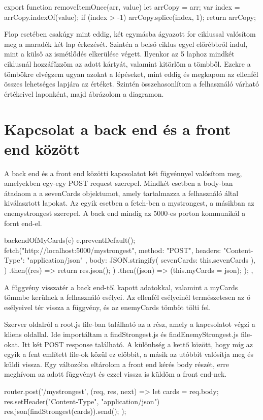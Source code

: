 \begin{python}
export function removeItemOnce(arr, value) {
    let arrCopy = arr;
    var index = arrCopy.indexOf(value);
    if (index > -1) {
      arrCopy.splice(index, 1);
    }
    return arrCopy;
}
\end{python}

Flop esetében csakúgy mint eddig, két egymásba ágyazott for ciklussal valósítom meg a maradék két lap érkezését. Szintén a belső ciklus egyel előrébbről indul, mint a külső az ismétlődés elkerülése végett. Ilyenkor az 5 laphoz mindkét ciklusnál hozzáfűzzöm az adott kártyát, valamint kitörlöm a tömbből. Ezekre a tömbökre elvégzem ugyan azokat a lépéseket, mint eddig és megkapom az ellenfél összes lehetséges lapjára az értéket. Szintén összehasonlítom a felhasználó várható értékeivel laponként, majd ábrázolom a diagramon.

\section{Kapcsolat a back end és a front end között}
A back end és a front end közötti kapcsolatot két fügvénnyel valósítom meg, amelyekben egy-egy POST request szerepel. Mindkét esetben a body-ban átadaom a a sevenCards objektumot, amely tartalmazza a felhasználó által kiválasztott lapokat. Az egyik esetben a fetch-ben a mystrongest, a másikban az enemystrongest szerepel. A back end mindig az 5000-es porton kommunikál a fornt end-el.

\begin{python}
backendOfMyCards(e) {
      e.preventDefault();
      fetch("http://localhost:5000/mystrongest", {
        method: "POST",
        headers: { "Content-Type": "application/json" },
        body: JSON.stringify({ sevenCards: this.sevenCards }),
      })
        .then((res) => {
          return res.json();
        })
        .then((json) => {
          (this.myCards = json);
        });
    },
\end{python}

A függvény visszatér a back end-től kapott adatokkal, valamint a myCards tömmbe kerülnek a felhasználó esélyei. Az ellenfél esélyeinél természetesen az ő esélyeivel tér vissza a függvény, és az enemyCards tömböt tölti fel.

Szerver oldalról a root.js file-ban található az a rész, amely a kapcsolatot végzi a kliens oldallal. Ide importáltam a findStrongest.js és findEnemyStrongest.js file-okat. Itt két POST response található. A különbség a kettő között, hogy míg az egyik a fent említett file-ok közül ez előbbit, a másik az utóbbit valósítja meg és küldi vissza. Egy változóba eltárolom a front end kérés body részét, erre meghívom az adott függvényt és ezzel vissza is küldöm a front end-nek.

\begin{python}
router.post('/mystrongest', (req, res, next) => {
    let cards = req.body;
    res.setHeader("Content-Type", "application/json")
    res.json(findStrongest(cards)).send();
});
\end{python}
